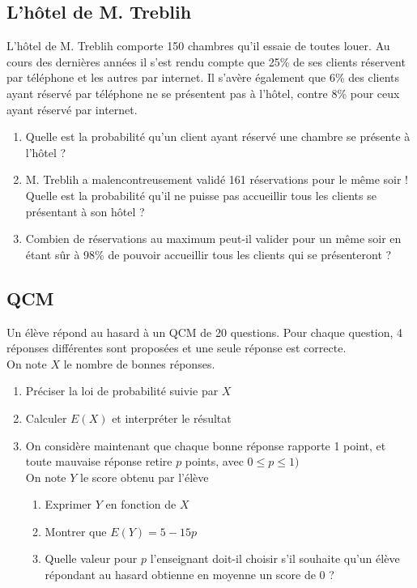 \documentclass[oneside,12pt]{article}          %
\begin{document}
\subsection{L'hôtel de M. Treblih}
L'hôtel de M. Treblih comporte 150 chambres qu'il essaie de toutes louer. Au cours des dernières années il s'est rendu compte que 25\% de ses clients réservent par téléphone et les autres par internet. Il s'avère également que 6\% des clients ayant réservé par téléphone ne se présentent pas à l'hôtel, contre 8\% pour ceux ayant réservé par internet.
\begin{enumerate}
    \item Quelle est la probabilité qu'un client ayant réservé une chambre se présente à l'hôtel ?
    \item M. Treblih a malencontreusement validé 161 réservations pour le même soir ! Quelle est la probabilité qu'il ne puisse pas accueillir tous les clients se présentant à son hôtel ?
    \item[\faCalculator] Combien de réservations au maximum peut-il valider pour un même soir en étant sûr à 98\% de pouvoir accueillir tous les clients qui se présenteront ?
\end{enumerate}



\subsection{QCM}
Un élève répond au hasard à un QCM de 20 questions. Pour chaque question, 4 réponses différentes sont proposées et une seule réponse est correcte.\\
On note $X$ le nombre de bonnes réponses.
\begin{enumerate}
    \item Préciser la loi de probabilité suivie par $X$
    \item Calculer $E(X)$ et interpréter le résultat
    \item On considère maintenant que chaque bonne réponse rapporte 1 point, et toute mauvaise réponse retire $p$ points, avec $0\leq p\leq1)$\\
    On note $Y$ le score obtenu par l'élève
    \begin{enumerate}
        \item Exprimer $Y$ en fonction de $X$
        \item Montrer que $E(Y)=5-15p$
        \item Quelle valeur pour $p$ l'enseignant doit-il choisir s'il souhaite qu'un élève répondant au hasard obtienne en moyenne un score de 0 ?
    \end{enumerate}
\end{enumerate}
\end{document}

